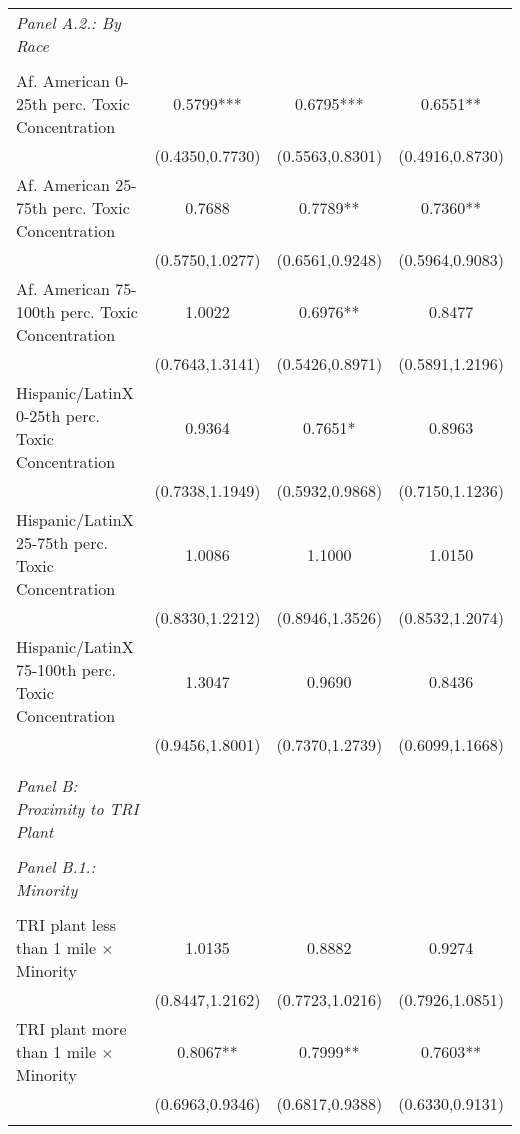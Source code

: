 \begin{table}[H]
\begin{threeparttable}
\begin{tabular}{@{\extracolsep{5pt}}lccc}
{\it Panel A.2.: By Race }\\                 &  &  &    \\
Af. American 0-25th perc. Toxic Concentration&      0.5799***&      0.6795***&      0.6551** \\
                    &(0.4350,0.7730)   &(0.5563,0.8301)   &(0.4916,0.8730)   \\
Af. American 25-75th perc. Toxic Concentration&      0.7688   &      0.7789** &      0.7360** \\
                    &(0.5750,1.0277)   &(0.6561,0.9248)   &(0.5964,0.9083)   \\
Af. American 75-100th perc. Toxic Concentration&      1.0022   &      0.6976** &      0.8477   \\
                    &(0.7643,1.3141)   &(0.5426,0.8971)   &(0.5891,1.2196)   \\
Hispanic/LatinX 0-25th perc. Toxic Concentration&      0.9364   &      0.7651*  &      0.8963   \\
                    &(0.7338,1.1949)   &(0.5932,0.9868)   &(0.7150,1.1236)   \\
Hispanic/LatinX 25-75th perc. Toxic Concentration&      1.0086   &      1.1000   &      1.0150   \\
                    &(0.8330,1.2212)   &(0.8946,1.3526)   &(0.8532,1.2074)   \\
Hispanic/LatinX 75-100th perc. Toxic Concentration&      1.3047   &      0.9690   &      0.8436   \\
                    &(0.9456,1.8001)   &(0.7370,1.2739)   &(0.6099,1.1668)   \\
             \\[-1.8ex]\hline        \hline \\[-1.8ex] 
  {\it Panel B: Proximity to TRI Plant}\\                                  \hline \\[-1.8ex]        
{\it Panel B.1.: Minority} \\                                  &  &  &    \\
TRI plant less than 1 mile $\times$ Minority&      1.0135   &      0.8882   &      0.9274   \\
                    &(0.8447,1.2162)   &(0.7723,1.0216)   &(0.7926,1.0851)   \\
TRI plant more than 1 mile $\times$  Minority&      0.8067** &      0.7999** &      0.7603** \\
                    &(0.6963,0.9346)   &(0.6817,0.9388)   &(0.6330,0.9131)   \\
       \hline \\[-1.8ex] 
         

\end{tabular}
\end{threeparttable}
\end{table}
